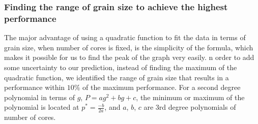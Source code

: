 \vspace{\baselineskip}	
\subsubsection{Finding the range of grain size to achieve the highest performance}
The major advantage of using a quadratic function to fit the data in terms of grain size, when number of cores is fixed, is the simplicity of the formula, which makes it possible for us to find the peak of the graph very easily. n order to add some uncertainty to our prediction, instead of finding the maximum of the quadratic function, we identified the range of grain size that results in a performance within $10\%$ of the maximum performance. For a second degree polynomial in terms of $g$, $P=ag^2+bg+c$, the minimum or maximum of the polynomial is located at $p^{*}=\frac{-b}{2a}$, and $a$, $b$, $c$ are 3rd degree polynomials of number of cores.    

